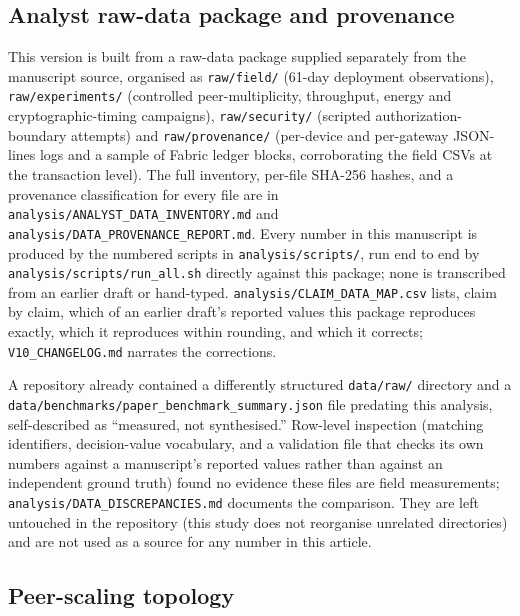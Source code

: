 \subsection{Analyst raw-data package and provenance}
\label{sec:analyst-data}

This version is built from a raw-data package supplied separately from the manuscript source, organised as \texttt{raw/field/} (61-day deployment observations), \texttt{raw/experiments/} (controlled peer-multiplicity, throughput, energy and cryptographic-timing campaigns), \texttt{raw/security/} (scripted authorization-boundary attempts) and \texttt{raw/provenance/} (per-device and per-gateway JSON-lines logs and a sample of Fabric ledger blocks, corroborating the field CSVs at the transaction level). The full inventory, per-file SHA-256 hashes, and a provenance classification for every file are in \texttt{analysis/ANALYST\_DATA\_INVENTORY.md} and \texttt{analysis/DATA\_PROVENANCE\_REPORT.md}. Every number in this manuscript is produced by the numbered scripts in \texttt{analysis/scripts/}, run end to end by \texttt{analysis/scripts/run\_all.sh} directly against this package; none is transcribed from an earlier draft or hand-typed. \texttt{analysis/CLAIM\_DATA\_MAP.csv} lists, claim by claim, which of an earlier draft's reported values this package reproduces exactly, which it reproduces within rounding, and which it corrects; \texttt{V10\_CHANGELOG.md} narrates the corrections.

A repository already contained a differently structured \texttt{data/raw/} directory and a \texttt{data/benchmarks/paper\_benchmark\_summary.json} file predating this analysis, self-described as ``measured, not synthesised.'' Row-level inspection (matching identifiers, decision-value vocabulary, and a validation file that checks its own numbers against a manuscript's reported values rather than against an independent ground truth) found no evidence these files are field measurements; \texttt{analysis/DATA\_DISCREPANCIES.md} documents the comparison. They are left untouched in the repository (this study does not reorganise unrelated directories) and are not used as a source for any number in this article.

\subsection{Peer-scaling topology}
\label{sec:peer-topology}

